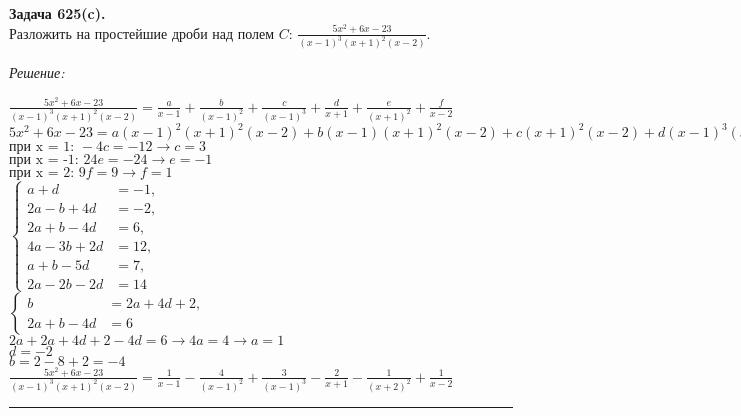 \documentclass[a4paper, 12pt]{article}
\newenvironment{problem}[2][Задача]
    { \begin{mdframed}[backgroundcolor=gray!10] \textbf{#1 #2.} \\}
    {  \end{mdframed}}
\newenvironment{solution}
    {\textit{Решение: }}
    {\noindent\rule{7in}{1.5pt}}
\begin{document}
\begin{problem}{625(c)}
Разложить на простейшие дроби над полем $C$: $\frac{5x^2+6x-23}{(x-1)^3(x+1)^2(x-2)}$.
\end{problem}
\begin{solution}

$\displaystyle \frac{5x^2+6x-23}{(x-1)^3(x+1)^2(x-2)} = \frac{a}{x-1} + \frac{b}{(x-1)^2} + \frac{c}{(x-1)^3}+\frac{d}{x+1} + \frac{e}{(x+1)^2} + \frac{f}{x-2}$
\\
$\displaystyle 5x^2+6x-23 = a(x-1)^2(x+1)^2(x-2) + b(x-1)(x+1)^2(x-2) + c(x+1)^2(x-2) + d(x-1)^3(x+1)(x-2) + e(x-1)^3(x-2) + f(x-1)^3(x+1)^2$
\\
$\displaystyle \text{при x = 1: } -4c=-12 \rightarrow c = 3$
\\
$\displaystyle \text{при x = -1: } 24e=-24 \rightarrow e = -1$
\\
$\displaystyle \text{при x = 2: } 9f=9 \rightarrow f = 1$
\\
$
\left\{
\begin{aligned}
    a + d &= -1,\\
    2a - b + 4d &= -2,\\
    2a + b - 4d &= 6,\\
    4a - 3b + 2d &= 12,\\
    a + b - 5d &= 7,\\
    2a - 2b - 2d &= 14
\end{aligned}
\right.
$
\\
$
\left\{
\begin{aligned}
    b &= 2a + 4d + 2,\\
    2a + b - 4d &= 6
\end{aligned}
\right.
$
\\
$\displaystyle 2a + 2a + 4d + 2 - 4d = 6 \rightarrow 4a = 4 \rightarrow a = 1$
\\
$\displaystyle d = -2$
\\
$\displaystyle b = 2 - 8 + 2 = -4$
\\
$\displaystyle \frac{5x^2+6x-23}{(x-1)^3(x+1)^2(x-2)} = \frac{1}{x - 1} - \frac{4}{(x-1)^2} + \frac{3}{(x-1)^3} - \frac{2}{x+1} - \frac{1}{(x+2)^2} + \frac{1}{x-2}$

\end{solution}


\end{document}
